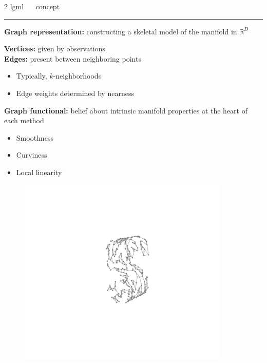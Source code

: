 \documentclass[11pt, compress, t, notes = noshow, xcolor = table, 
aspectratio = 1610]{beamer}
\newcommand{\maketag}[1]{\colorbox{highlightcol}{\textcolor{white}
{\MakeUppercase{#1}}}}
\newcommand{\highlight}[1]{\textcolor{highlightcol}{\textbf{#1}}}
\newcommand{\arritem}{\item[\highlight{$\rightarrow$}]}
\newcommand{\RD}{\mathbb{R}^D}
\begin{document}
\LARGE
\begin{frame}{\textcolor{gray!90}{2 lgml} ~~ concept}
\normalsize
\vspace{-0.5cm}
\noindent \textcolor{gray!90}{\rule{\textwidth}{1pt}}
\smallskip

\textbf{Graph representation:} constructing a skeletal model of the manifold in 
$\RD$

\vspace{0.3cm}

\begin{minipage}[b]{0.67\textwidth}
  \medskip
  \textbf{Vertices:} given by observations \\
  \textbf{Edges:} present between neighboring points
    \begin{itemize} 
      \arritem Typically, $k$-neighborhoods
      \arritem Edge weights determined by nearness
    \end{itemize}
  \vspace{0.3cm}
  \textbf{Graph functional:} belief about intrinsic manifold properties at the 
  heart of each method
  \begin{itemize}
    \arritem Smoothness ~ \maketag{LEM}
    \arritem Curviness ~ \maketag{HLLE}
    \arritem Local linearity ~ \maketag{LLE} \maketag{SSLLE}
  \end{itemize}
\end{minipage}%
\begin{minipage}[b]{0.33\textwidth}
  \begin{figure}[H]
    \includegraphics[trim = 250 190 220 160, clip, %
      width = 0.9\textwidth]{figures/s_curve_connected}
  \end{figure}
\end{minipage}

\end{frame}
\end{document}
